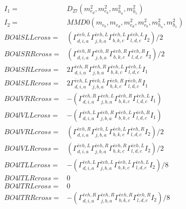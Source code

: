 \documentclass[A4,landscape]{article}
\begin{document}
\begin{align} 
I_1 = & D_{27}(m^2_{e_{{d}}}, m^2_{e_{{b}}}, m^2_{h_{{a}}}, m^2_{h_{{c}}}) \\ 
I_2 = & MMD0(m_{e_{{b}}}, m_{e_{{d}}}, m^2_{e_{{d}}}, m^2_{e_{{b}}}, m^2_{h_{{a}}}, m^2_{h_{{c}}}) \\ 
  BO4lSLLcross= & ( \Gamma^{\bar{e}e h ,L}_{d, i, a} \Gamma^{\bar{e}e h ,L}_{j, b, a} \Gamma^{\bar{e}e h ,L}_{b, k, c} \Gamma^{\bar{e}e h ,L}_{l, d, c} I_2)/2 \\ 
  BO4lSRRcross= & ( \Gamma^{\bar{e}e h ,R}_{d, i, a} \Gamma^{\bar{e}e h ,R}_{j, b, a} \Gamma^{\bar{e}e h ,R}_{b, k, c} \Gamma^{\bar{e}e h ,R}_{l, d, c} I_2)/2 \\ 
  BO4lSRLcross= & 2  \Gamma^{\bar{e}e h ,R}_{d, i, a} \Gamma^{\bar{e}e h ,R}_{j, b, a} \Gamma^{\bar{e}e h ,L}_{b, k, c} \Gamma^{\bar{e}e h ,L}_{l, d, c} I_1 \\ 
  BO4lSLRcross= & 2  \Gamma^{\bar{e}e h ,L}_{d, i, a} \Gamma^{\bar{e}e h ,L}_{j, b, a} \Gamma^{\bar{e}e h ,R}_{b, k, c} \Gamma^{\bar{e}e h ,R}_{l, d, c} I_1 \\ 
  BO4lVRRcross= & -( \Gamma^{\bar{e}e h ,R}_{d, i, a} \Gamma^{\bar{e}e h ,L}_{j, b, a} \Gamma^{\bar{e}e h ,R}_{b, k, c} \Gamma^{\bar{e}e h ,L}_{l, d, c} I_1) \\ 
  BO4lVLLcross= & -( \Gamma^{\bar{e}e h ,L}_{d, i, a} \Gamma^{\bar{e}e h ,R}_{j, b, a} \Gamma^{\bar{e}e h ,L}_{b, k, c} \Gamma^{\bar{e}e h ,R}_{l, d, c} I_1) \\ 
  BO4lVRLcross= & ( \Gamma^{\bar{e}e h ,R}_{d, i, a} \Gamma^{\bar{e}e h ,L}_{j, b, a} \Gamma^{\bar{e}e h ,L}_{b, k, c} \Gamma^{\bar{e}e h ,R}_{l, d, c} I_2)/2 \\ 
  BO4lVLRcross= & ( \Gamma^{\bar{e}e h ,L}_{d, i, a} \Gamma^{\bar{e}e h ,R}_{j, b, a} \Gamma^{\bar{e}e h ,R}_{b, k, c} \Gamma^{\bar{e}e h ,L}_{l, d, c} I_2)/2 \\ 
  BO4lTLLcross= & -( \Gamma^{\bar{e}e h ,L}_{d, i, a} \Gamma^{\bar{e}e h ,L}_{j, b, a} \Gamma^{\bar{e}e h ,L}_{b, k, c} \Gamma^{\bar{e}e h ,L}_{l, d, c} I_2)/8 \\ 
  BO4lTLRcross= & 0 \\ 
  BO4lTRLcross= & 0 \\ 
  BO4lTRRcross= & -( \Gamma^{\bar{e}e h ,R}_{d, i, a} \Gamma^{\bar{e}e h ,R}_{j, b, a} \Gamma^{\bar{e}e h ,R}_{b, k, c} \Gamma^{\bar{e}e h ,R}_{l, d, c} I_2)/8 \\ 
\end{align} 
\end{document}
